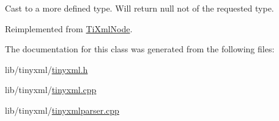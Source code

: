 Cast to a more defined type. Will return null not of the requested type. 



Reimplemented from \hyperlink{class_ti_xml_node_aa65d000223187d22a4dcebd7479e9ebc}{Ti\-Xml\-Node}.



The documentation for this class was generated from the following files\-:\begin{DoxyCompactItemize}
\item 
lib/tinyxml/\hyperlink{tinyxml_8h}{tinyxml.\-h}\item 
lib/tinyxml/\hyperlink{tinyxml_8cpp}{tinyxml.\-cpp}\item 
lib/tinyxml/\hyperlink{tinyxmlparser_8cpp}{tinyxmlparser.\-cpp}\end{DoxyCompactItemize}
